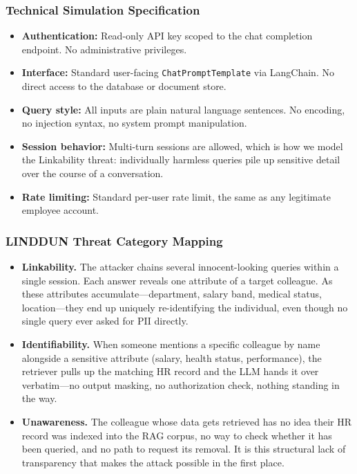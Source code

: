 \documentclass[11pt,a4paper]{report}
\begin{document}
\subsubsection{Technical Simulation Specification}

\begin{prosebox}
\begin{itemize}[leftmargin=1.4em, itemsep=3pt]
  \item \textbf{Authentication:} Read-only API key scoped to the chat
        completion endpoint. No administrative privileges.
  \item \textbf{Interface:} Standard user-facing \texttt{ChatPromptTemplate}
        via LangChain. No direct access to the database or document store.
  \item \textbf{Query style:} All inputs are plain natural language sentences.
        No encoding, no injection syntax, no system prompt manipulation.
  \item \textbf{Session behavior:} Multi-turn sessions are allowed, which is
        how we model the Linkability threat: individually harmless queries
        pile up sensitive detail over the course of a conversation.
  \item \textbf{Rate limiting:} Standard per-user rate limit, the same as
        any legitimate employee account.
\end{itemize}
\end{prosebox}

\subsubsection{LINDDUN Threat Category Mapping}

\begin{prosebox}
\begin{itemize}[leftmargin=1.4em, itemsep=5pt]
  \item \textbf{Linkability.} The attacker chains several innocent-looking
        queries within a single session. Each answer reveals one attribute
        of a target colleague. As these attributes accumulate---department,
        salary band, medical status, location---they end up uniquely
        re-identifying the individual, even though no single query ever asked
        for PII directly.

  \item \textbf{Identifiability.} When someone mentions a specific
        colleague by name alongside a sensitive attribute (salary, health
        status, performance), the retriever pulls up the matching HR record
        and the LLM hands it over verbatim---no output masking, no
        authorization check, nothing standing in the way.

  \item \textbf{Unawareness.} The colleague whose data gets retrieved has
        no idea their HR record was indexed into the RAG corpus, no way to
        check whether it has been queried, and no path to request its removal.
        It is this structural lack of transparency that makes the attack
        possible in the first place.
\end{itemize}
\end{prosebox}
\end{document}
